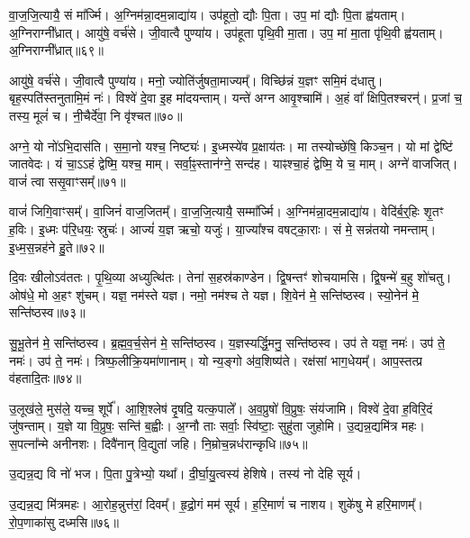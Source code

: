 वा॒ज॒जि॒त्यायै॒ सं मा᳚र्ज्मि।
अ॒ग्निम॑न्ना॒दम॒न्नाद्या॑य।
उप॑हूतो॒ द्यौः पि॒ता।
उप॒ मां द्यौः पि॒ता ह्व॑यताम्।
अ॒ग्निराग्नी᳚ध्रात्।
आयु॑षे॒ वर्च॑से।
जी॒वात्वै पुण्या॑य।
उप॑हूता पृथि॒वी मा॒ता।
उप॒ मां मा॒ता पृ॑थि॒वी ह्व॑यताम्।
अ॒ग्निराग्नी᳚ध्रात्॥६९॥\ip

आयु॑षे॒ वर्च॑से।
जी॒वात्वै पुण्या॑य।
मनो॒ ज्योति॑र्जुषता॒मा\-ज्यम्᳚।
विच्छि॑न्नं य॒ज्ञꣳ समि॒मं द॑धातु।
बृह॒स्पति॑स्तनुतामि॒मं नः॑।
विश्वे॑ दे॒वा इ॒ह मा॑दयन्ताम्।
यन्ते॑ अग्न आवृ॒श्चामि॑।
अ॒हं वा᳚ क्षिपि॒तश्चरन्॑।
प्र॒जां च॒ तस्य॒ मूलं॑ च।
नी॒चैर्दे॑वा॒ नि वृ॑श्चत॥७०॥\ip

अग्ने॒ यो नो॑\-ऽभि॒दास॑ति।
स॒मा॒नो यश्च॒ निष्ट्यः॑।
इ॒ध्मस्ये॑व प्र॒क्षाय॑तः।
मा तस्योच्छे॑षि॒ किञ्च॒न।
यो मां द्वेष्टि॑ जातवेदः।
यं चा॒ऽऽहं द्वेष्मि॒ यश्च॒ माम्।
सर्वा॒ꣴ॒स्तान॑ग्ने॒ सन्द॑ह।
याꣴश्चा॒हं द्वेष्मि॒ ये च॒ माम्।
अग्ने॑ वाजजित्।
वाजं॑ त्वा ससृ॒वाꣳसम्᳚॥७१॥\ip

वाजं॑ जिगि॒वाꣳसम्᳚।
वा॒जिनं॑ वाज॒जितम्᳚।
वा॒ज॒जि॒त्यायै॒ सम्मा᳚र्ज्मि।
अ॒ग्निम॑न्ना॒दम॒न्नाद्या॑य।
वेदि॑र्ब॒र्॒हिः शृ॒तꣳ ह॒विः।
इ॒ध्मः प॑रि॒धयः॒ स्रुचः॑।
आज्यं॑ य॒ज्ञ ऋचो॒ यजुः॑।
या॒ज्या᳚श्च वषट्का॒राः।
सं मे॒ सन्न॑तयो नमन्ताम्।
इ॒ध्म॒स॒न्नह॑ने हु॒ते॥७२॥\ip

दि॒वः खीलो\-ऽव॑ततः।
पृ॒थि॒व्या अध्युत्थि॑तः।
तेना॑ स॒हस्र॑काण्डेन।
द्वि॒षन्तꣳ॑ शोचयामसि।
द्वि॒षन्मे॑ ब॒हु शो॑चतु।
ओष॑धे॒ मो अ॒हꣳ शु॑चम्।
यज्ञ॒ नम॑स्ते यज्ञ।
नमो॒ नम॑श्च ते यज्ञ।
शि॒वेन॑ मे॒ सन्ति॑ष्ठस्व।
स्यो॒नेन॑ मे॒ सन्ति॑ष्ठस्व॥७३॥\ip

सु॒भू॒तेन॑ मे॒ सन्ति॑ष्ठस्व।
ब्र॒ह्म॒व॒र्च॒सेन॑ मे॒ सन्ति॑ष्ठस्व।
य॒ज्ञस्यर्द्धि॒मनु॒ सन्ति॑ष्ठस्व।
उप॑ ते यज्ञ॒ नमः॑।
उप॑ ते॒ नमः॑।
उप॑ ते॒ नमः॑।
त्रिष्फ॒लीक्रि॒यमा॑णानाम्।
यो न्य॒ङ्गो अ॑व॒शिष्य॑ते।
रक्ष॑सां भाग॒\-धेयम्᳚।
आप॒स्तत्प्र व॑हतादि॒तः॥७४॥\ip

उ॒लूख॑ले॒ मुस॑ले॒ यच्च॒ शूर्पे᳚।
आ॒शि॒श्लेष॑ दृ॒षदि॒ यत्क॒पाले᳚।
अ॒व॒प्रुषो॑ वि॒प्रुषः॒ संय॑जामि।
विश्वे॑ दे॒वा ह॒विरि॒दं जु॑षन्ताम्।
य॒ज्ञे या वि॒प्रुषः॒ सन्ति॑ ब॒ह्वीः।
अ॒ग्नौ ताः सर्वाः॒ स्वि॑ष्टाः॒ सुहु॑ता जुहोमि।
उ॒द्यन्न॒द्यमि॑त्र महः।
स॒पत्ना᳚न्मे अनीनशः।
दिवै॑नान् वि॒द्युता॑ जहि।
नि॒म्रोच॒न्नध॑रान्कृधि॥७५॥\ip

उ॒द्यन्न॒द्य वि नो॑ भज।
पि॒ता पु॒त्रेभ्यो॒ यथा᳚।
दी॒र्घा॒यु॒त्वस्य॑ हेशिषे।
तस्य॑ नो देहि सूर्य।


उ॒द्यन्न॒द्य मि॑त्रमहः।
आ॒रोह॒न्नुत्त॑रां॒ दिवम्᳚।
हृ॒द्रो॒गं मम॑ सूर्य।
ह॒रि॒माणं॑ च नाशय।
शुके॑षु मे हरि॒माणम्᳚।
रो॒प॒णाका॑सु दध्मसि॥७६॥\ip

